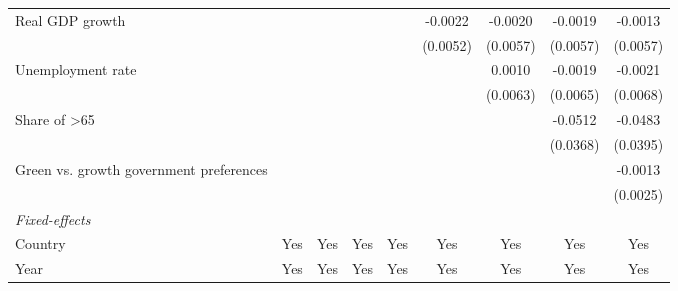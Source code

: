 \begin{table}[htbp]
\begin{tabular}{lcccccccc}
      Real GDP growth                                                                   &                       &          &                &                & -0.0022        & -0.0020        & -0.0019        & -0.0013\\   
                                                                                        &                       &          &                &                & (0.0052)       & (0.0057)       & (0.0057)       & (0.0057)\\   
      Unemployment rate                                                                 &                       &          &                &                &                & 0.0010         & -0.0019        & -0.0021\\   
                                                                                        &                       &          &                &                &                & (0.0063)       & (0.0065)       & (0.0068)\\   
      Share of >65                                                                      &                       &          &                &                &                &                & -0.0512        & -0.0483\\   
                                                                                        &                       &          &                &                &                &                & (0.0368)       & (0.0395)\\   
      Green vs. growth government preferences                                           &                       &          &                &                &                &                &                & -0.0013\\   
                                                                                        &                       &          &                &                &                &                &                & (0.0025)\\   
      \midrule
      \emph{Fixed-effects}\\
      Country                                                                           & Yes                   & Yes      & Yes            & Yes            & Yes            & Yes            & Yes            & Yes\\  
      Year                                                                              & Yes                   & Yes      & Yes            & Yes            & Yes            & Yes            & Yes            & Yes\\  

\end{tabular}
\end{table}
